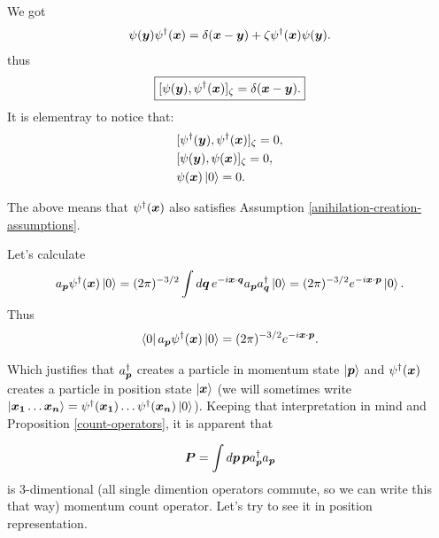 \documentclass[main.tex]{subfiles}
\begin{document}
We got 
\begin{equation}
\psi(\boldsymbol{y})\psi^\dagger(\boldsymbol{x}) = \delta(\boldsymbol{x} - \boldsymbol{y}) + \zeta \psi^\dagger(\boldsymbol{x}) \psi(\boldsymbol{y}).
\end{equation}
thus
\begin{equation}
\boxed{
[\psi(\boldsymbol{y}), \psi^\dagger(\boldsymbol{x})]_\zeta = \delta(\boldsymbol{x} - \boldsymbol{y}). 
}
\end{equation}
It is elementray to notice that:
\begin{align*}
&[\psi^\dagger(\boldsymbol{y}), \psi^\dagger(\boldsymbol{x})]_\zeta = 0,\\
&[\psi(\boldsymbol{y}), \psi(\boldsymbol{x})]_\zeta = 0,\\
&\psi(\boldsymbol{x}) \ket{0} = 0.
\end{align*}

The above means that $\psi^\dagger(\boldsymbol{x})$ also satisfies Assumption \ref{anihilation-creation-assumptions}.

Let's calculate
\begin{align*}
a_{\boldsymbol{p}} \psi^\dagger(\boldsymbol{x})\ket{0} = (2\pi)^{-3/2}\int d\boldsymbol{q}\, e^{-i\boldsymbol{x}\cdot \boldsymbol{q}} a_{\boldsymbol{p}} a^\dagger_{\boldsymbol{q}} \ket{0} = (2\pi)^{-3/2} e^{-i\boldsymbol{x}\cdot \boldsymbol{p}} \ket{0}. 
\end{align*}
Thus
\begin{equation}
\bra{0} a_{\boldsymbol{p}} \psi^\dagger(\boldsymbol{x})\ket{0} = (2\pi)^{-3/2} e^{-i\boldsymbol{x}\cdot \boldsymbol{p}}.
\end{equation}

Which justifies that $a^\dagger_{\boldsymbol{p}}$ creates a particle in momentum state $\ket{\boldsymbol{p}}$ and $\psi^\dagger(\boldsymbol{x})$ creates a particle in position state $\ket{\boldsymbol{x}}$ (we will sometimes write $\ket{\bs{x_1}\dots\bs{x_n}} = \psi^\dagger(\bs{x_1}) \dots \psi^\dagger(\bs{x_n}) \ket{0}$). Keeping that interpretation in mind and Proposition \ref{count-operators}, it is apparent that

\begin{equation}
\boldsymbol{P} = \int d\boldsymbol{p}\, \boldsymbol{p}a^\dagger_{\boldsymbol{p}}a_{\boldsymbol{p}}
\end{equation} 
is $3$-dimentional (all single dimention operators commute, so we can write this that way) momentum count operator. Let's try to see it in position representation.
\end{document}
